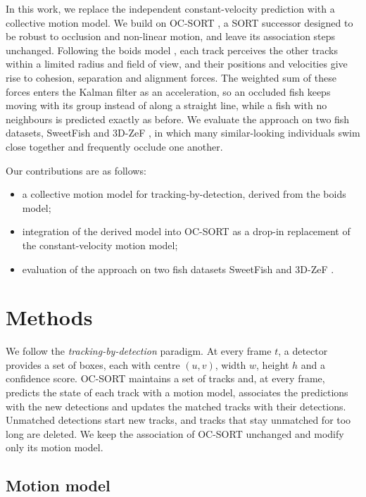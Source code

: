 \documentclass[9pt,twoside]{pnas-new}
\begin{document}
In this work, we replace the independent constant-velocity prediction with a collective motion model.
We build on OC-SORT \cite{ocsort}, a SORT \cite{sort} successor designed to be robust to occlusion and non-linear motion, and leave its association steps unchanged.
Following the boids model \cite{reynolds}, each track perceives the other tracks within a limited radius and field of view, and their positions and velocities give rise to cohesion, separation and alignment forces. 
The weighted sum of these forces enters the Kalman filter as an acceleration, so an occluded fish keeps moving with its group instead of along a straight line, while a fish with no neighbours is predicted exactly as before.
We evaluate the approach on two fish datasets, SweetFish \cite{sweetfish} and 3D-ZeF \cite{3dzef}, in which many similar-looking individuals swim close together and frequently occlude one another.


Our contributions are as follows:
\begin{itemize}
    \item a collective motion model for tracking-by-detection, derived from the boids model;
    \item integration of the derived model into OC-SORT \cite{ocsort} as a drop-in replacement of the constant-velocity motion model;
    \item evaluation of the approach on two fish datasets SweetFish \cite{sweetfish} and 3D-ZeF \cite{3dzef}.
\end{itemize}


\section*{Methods}
We follow the \emph{tracking-by-detection} paradigm.
At every frame $t$, a detector provides a set of boxes, each with centre $(u, v)$, width $w$, height $h$ and a confidence score.
OC-SORT \cite{ocsort} maintains a set of tracks and, at every frame, predicts the state of each track with a motion model, associates the predictions with the new detections and updates the matched tracks with their detections.
Unmatched detections start new tracks, and tracks that stay unmatched for too long are deleted.
We keep the association of OC-SORT unchanged and modify only its motion model.

\subsection*{Motion model}
\end{document}

